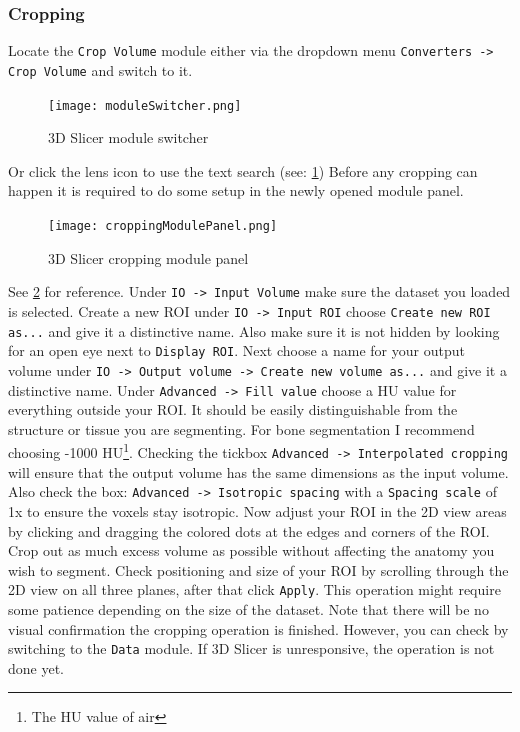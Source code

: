 \subsubsection{Cropping} \label{crop}
Locate the \texttt{Crop Volume} module either via the dropdown menu
\texttt{Converters -> Crop Volume} and switch to it.
\begin{figure}[h!]
	\centerline{
		\texttt{[image: moduleSwitcher.png]}}
	  \caption{3D Slicer module switcher}
	  \label{fig:mS}
\end{figure}
Or click the lens icon to use the text search (see: \cref{fig:mS})
Before any cropping can happen it is required to do some setup in the newly opened module panel.
\begin{figure}[h!]
	\centerline{
		\texttt{[image: croppingModulePanel.png]}}
	  \caption{3D Slicer cropping module panel}
	  \label{fig:cMP}
\end{figure}
See \cref{fig:cMP} for reference.
Under \texttt{IO -> Input Volume} make sure the dataset you loaded is selected.
Create a new ROI under \texttt{IO -> Input ROI} choose \texttt{Create new ROI as...} and give it a distinctive name. Also make sure it is not hidden by looking for an open eye next to \texttt{Display ROI}.
Next choose a name for your output volume under \texttt{IO -> Output volume -> Create new volume as...} and give it a distinctive name.
Under \texttt{Advanced -> Fill value} choose a HU value for everything outside your ROI. It should be easily distinguishable from the structure or tissue you are segmenting. For bone segmentation I recommend choosing -1000 HU\footnote{The HU value of air}. Checking the tickbox \texttt{Advanced -> Interpolated cropping} will ensure that the output volume has the same dimensions as the input volume.
Also check the box: \texttt{Advanced -> Isotropic spacing} with a \texttt{Spacing scale} of 1x to ensure the voxels stay isotropic.
Now adjust your ROI in the 2D view areas by clicking and dragging the colored dots at the edges and corners of the ROI.
Crop out as much excess volume as possible without affecting the anatomy you wish to segment.
Check positioning and size of your ROI by scrolling through the 2D view on all three planes, after that click \texttt{Apply}.
This operation might require some patience depending on the size of the dataset.
Note that there will be no visual confirmation the cropping operation is finished.
However, you can check by switching to the \texttt{Data} module.
If 3D Slicer is unresponsive, the operation is not done yet.
